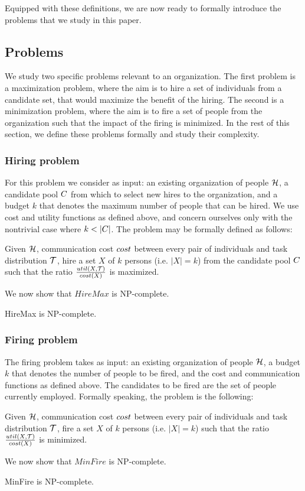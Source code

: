 Equipped with these definitions, we are now ready to formally introduce the problems that we study in this paper.

\subsection{Problems}

We study two specific problems relevant to an organization.
The first problem is a maximization problem, where the aim is to hire a set of individuals from a candidate set, that would maximize the benefit of the hiring.
The second is a minimization problem, where the aim is to fire a set of people from the organization such that the impact of the firing is minimized.
In the rest of this section, we define these problems formally and study their complexity.

\subsubsection{Hiring problem}

For this problem we consider as input: an existing organization of people $\mathcal{H}$, a candidate pool ${C}$ from which to select new hires to the organization, and a budget $k$ that denotes the maximum number of people that can be hired.
We use cost and utility functions as defined above, and concern ourselves only with the nontrivial case where $k < |{C}|$.
The problem may be formally defined as follows:
\begin{problem}
[HireMax] Given $\mathcal{H}$, communication cost $cost$ between every pair of individuals and task distribution $\mathcal{T}$, hire a set $X$ of $k$ persons (i.e. $|X| = k$) from the candidate pool ${C}$ such that the ratio $\frac{{util}(X, \mathcal{T})}{cost(X)}$ is maximized.
\end{problem}

We now show that $HireMax$ is NP-complete.
\begin{theorem}
HireMax is NP-complete.
\end{theorem}

\subsubsection{Firing problem}

The firing problem takes as input: an existing organization of people $\mathcal{H}$, a budget $k$ that denotes the number of people to be fired, and the cost and communication functions as defined above. 
The candidates to be fired are the set of people currently employed. 
Formally speaking, the problem is the following:
\begin{problem}
[MinFire] Given $\mathcal{H}$, communication cost $cost$ between every pair of individuals and task distribution $\mathcal{T}$, fire a set $X$ of $k$ persons (i.e. $|X| = k$) such that the ratio $\frac{{util}(X, \mathcal{T})}{cost(X)}$ is minimized.
\end{problem}

We now show that $MinFire$ is NP-complete.
\begin{theorem}
MinFire is NP-complete.
\end{theorem}
